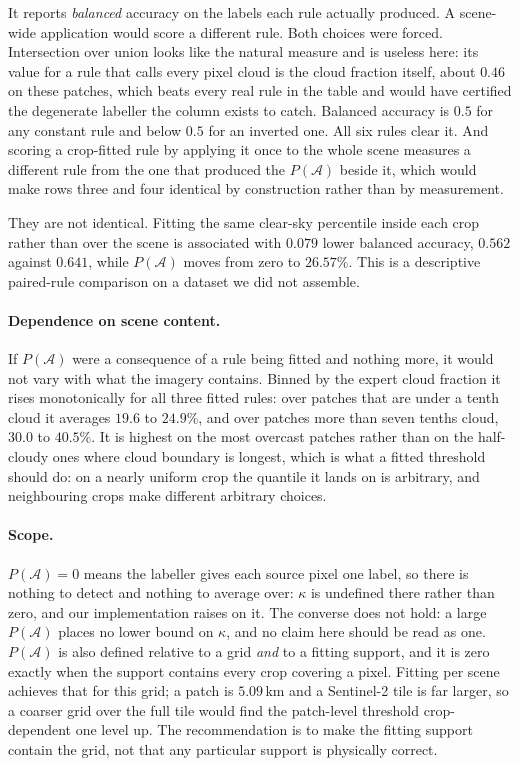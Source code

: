 \documentclass[10pt,twocolumn,letterpaper]{article}
\newcommand{\kap}{\kappa}
\newcommand{\A}{\mathcal{A}}
\begin{document}
It reports \emph{balanced} accuracy on the labels each rule actually produced. A
scene-wide application would score a different rule. Both choices were forced. Intersection
over union looks like the natural measure and is useless here: its value for a rule
that calls every pixel cloud is the cloud fraction itself, about $0.46$ on these
patches, which beats every real rule in the table and would have certified the
degenerate labeller the column exists to catch. Balanced accuracy is $0.5$ for any
constant rule and below $0.5$ for an inverted one. All six rules clear it. And scoring
a crop-fitted rule by applying it once to the whole scene measures a different rule
from the one that produced the $P(\A)$ beside it, which would make rows three and four
identical by construction rather than by measurement.

They are not identical. Fitting the same clear-sky percentile inside each crop rather
than over the scene is associated with $0.079$ lower balanced accuracy, $0.562$
against $0.641$, while $P(\A)$ moves from zero to $26.57\%$. This is a descriptive
paired-rule comparison on a dataset we did not assemble.

\paragraph{Dependence on scene content.} If $P(\A)$ were
a consequence of a rule being fitted and nothing more, it would not vary with what
the imagery contains. Binned by the expert cloud fraction it rises monotonically for
all three fitted rules: over patches that are under a tenth cloud it averages
$19.6$ to $24.9\%$, and over patches more than seven tenths cloud, $30.0$ to
$40.5\%$. It is highest on the most overcast patches rather than on the half-cloudy
ones where cloud boundary is longest, which is what a fitted threshold should do: on a
nearly uniform crop the quantile it lands on is arbitrary, and neighbouring crops make
different arbitrary choices.

\paragraph{Scope.} $P(\A) = 0$ means the labeller
gives each source pixel one label, so there is nothing to detect and nothing to
average over: $\kap$ is undefined there rather than zero, and our implementation
raises on it. The converse does not hold: a large $P(\A)$ places no lower bound on
$\kap$, and no claim here should be read as one. $P(\A)$ is also defined relative to a
grid \emph{and} to a fitting support, and it is zero exactly when the support contains
every crop covering a pixel. Fitting per scene achieves that for this grid; a patch is
$5.09$\,km and a Sentinel-2 tile is far larger, so a coarser grid over the full tile
would find the patch-level threshold crop-dependent one level up. The recommendation
is to make the fitting support contain the grid, not that any particular support is
physically correct.
\end{document}
